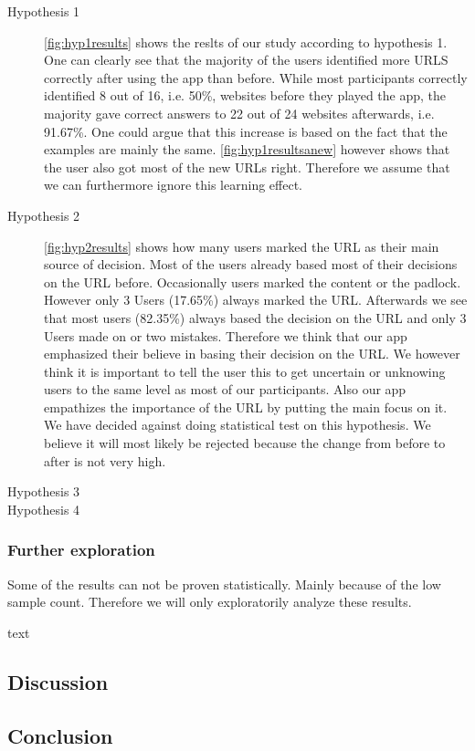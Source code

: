 \begin{description}
\item[Hypothesis 1]
\autoref{fig:hyp1results} shows the reslts of our study according to hypothesis 1. One can clearly see that the majority of the users identified more URLS correctly after using the app than before. While most participants correctly identified 8 out of 16, i.e. 50\%, websites before they played the app, the majority gave correct answers to 22 out of 24 websites afterwards, i.e. 91.67\%. One could argue that this increase is based on the fact that the examples are mainly the same. \autoref{fig:hyp1resultsanew} however shows that the user also got most of the new URLs right. Therefore we assume that we can furthermore ignore this learning effect. 
\item[Hypothesis 2]
\autoref{fig:hyp2results} shows how many users marked the URL as their main source of decision.
Most of the users already based most of their decisions on the URL before.
Occasionally users marked the content or the padlock.
However only 3 Users (17.65\%) always marked the URL.
Afterwards we see that most users (82.35\%) always based the decision on the URL and only 3 Users made on or two mistakes.
Therefore we think that our app emphasized their believe in basing their decision on the URL.
We however think it is important to tell the user this to get uncertain or unknowing users to the same level as most of our participants.
Also our app empathizes the importance of the URL by putting the main focus on it.
We have decided against doing statistical test on this hypothesis.
We believe it will most likely be rejected because the change from before to after is not very high.
\item[Hypothesis 3]

\item[Hypothesis 4]
\end{description}


\subsubsection{Further exploration}
Some of the results can not be proven statistically.
Mainly because of the low sample count. 
Therefore we will only exploratorily analyze these results.
\begin{description}
\item[text]
\end{description}
\subsection{Discussion}
\subsection{Conclusion}
